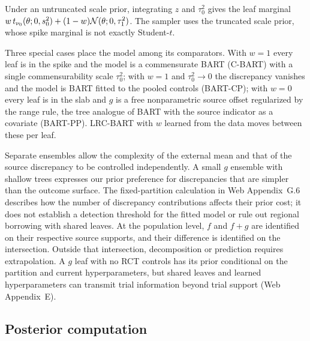 \begin{samepage}
Under an untruncated scale prior, integrating $z$ and $\tau_0^2$ gives the leaf marginal $w\,t_{\nu_0}(\theta;0,s_0^2)+(1-w)\mathcal{N}(\theta;0,\tau_1^2)$. The sampler uses the truncated scale prior, whose spike marginal is not exactly Student-$t$.\par
\end{samepage}

Three special cases place the model among its comparators. With $w=1$ every leaf is in the spike and the model is a commensurate BART (C-BART) with a single commensurability scale $\tau_0^2$; with $w=1$ and $\tau_0^2\to0$ the discrepancy vanishes and the model is BART fitted to the pooled controls (BART-CP); with $w=0$ every leaf is in the slab and $g$ is a free nonparametric source offset regularized by the range rule, the tree analogue of BART with the source indicator as a covariate (BART-PP). LRC-BART with $w$ learned from the data moves between these per leaf.

Separate ensembles allow the complexity of the external mean and that of the source discrepancy to be controlled independently. A small $g$ ensemble with shallow trees expresses our prior preference for discrepancies that are simpler than the outcome surface. The fixed-partition calculation in Web Appendix~G.6 describes how the number of discrepancy contributions affects their prior cost; it does not establish a detection threshold for the fitted model or rule out regional borrowing with shared leaves. At the population level, $f$ and $f+g$ are identified on their respective source supports, and their difference is identified on the intersection. Outside that intersection, decomposition or prediction requires extrapolation. A $g$ leaf with no RCT controls has its prior conditional on the partition and current hyperparameters, but shared leaves and learned hyperparameters can transmit trial information beyond trial support (Web Appendix~E).

\subsection{Posterior computation}
\label{sec:posterior}

